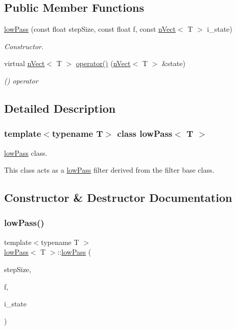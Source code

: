 \subsection*{Public Member Functions}
\begin{DoxyCompactItemize}
\item 
\hyperlink{classlowPass_a50525f73036e6c40d03be1becbfa0068}{low\+Pass} (const float step\+Size, const float f, const \hyperlink{classnVect}{n\+Vect}$<$ T $>$ i\+\_\+state)
\begin{DoxyCompactList}\small\item\em Constructor. \end{DoxyCompactList}\item 
virtual \hyperlink{classnVect}{n\+Vect}$<$ T $>$ \hyperlink{classlowPass_a4d4458814fd69f87c5622227f6527468}{operator()} (\hyperlink{classnVect}{n\+Vect}$<$ T $>$ \&state)
\begin{DoxyCompactList}\small\item\em () operator \end{DoxyCompactList}\end{DoxyCompactItemize}


\subsection{Detailed Description}
\subsubsection*{template$<$typename T$>$\newline
class low\+Pass$<$ T $>$}

\hyperlink{classlowPass}{low\+Pass} class. 

This class acts as a \hyperlink{classlowPass}{low\+Pass} filter derived from the filter base class. 

\subsection{Constructor \& Destructor Documentation}
\mbox{\label{classlowPass_a50525f73036e6c40d03be1becbfa0068}} 
\subsubsection{\texorpdfstring{low\+Pass()}{lowPass()}}
{\footnotesize\ttfamily template$<$typename T $>$ \\
\hyperlink{classlowPass}{low\+Pass}$<$ T $>$\+::\hyperlink{classlowPass}{low\+Pass} (\begin{DoxyParamCaption}\item[{const float}]{step\+Size,  }\item[{const float}]{f,  }\item[{const \hyperlink{classnVect}{n\+Vect}$<$ T $>$}]{i\+\_\+state }\end{DoxyParamCaption})}




